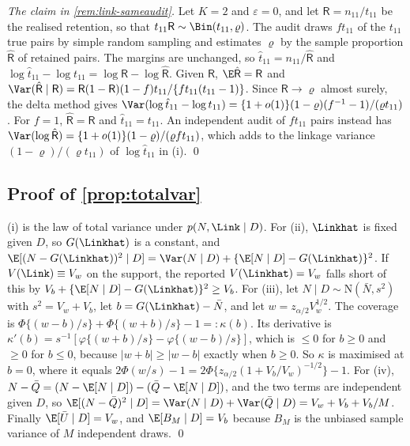 \emph{The claim in \cref{rem:link-sameaudit}.} Let $K=2$ and $\varepsilon=0$, and let $\mathsf R=n_{11}/t_{11}$ be the realised retention, so that $t_{11}\mathsf R\sim\Bin(t_{11},\varrho)$. The audit draws $ft_{11}$ of the $t_{11}$ true pairs by simple random sampling and estimates $\varrho$ by the sample proportion $\hat{\mathsf R}$ of retained pairs. The margins are unchanged, so $\hat t_{11}=n_{11}/\hat{\mathsf R}$ and $\log\hat t_{11}-\log t_{11}=\log\mathsf R-\log\hat{\mathsf R}$. Given $\mathsf R$, $\E\hat{\mathsf R}=\mathsf R$ and $\Var(\hat{\mathsf R}\mid\mathsf R)=\mathsf R(1-\mathsf R)(1-f)t_{11}/\{ft_{11}(t_{11}-1)\}$. Since $\mathsf R\to\varrho$ almost surely, the delta method gives $\Var(\log\hat t_{11}-\log t_{11})=\{1+o(1)\}(1-\varrho)(f^{-1}-1)/(\varrho t_{11})$. For $f=1$, $\hat{\mathsf R}=\mathsf R$ and $\hat t_{11}=t_{11}$. An independent audit of $ft_{11}$ pairs instead has $\Var(\log\hat{\mathsf R})=\{1+o(1)\}(1-\varrho)/(\varrho ft_{11})$, which adds to the linkage variance $(1-\varrho)/(\varrho t_{11})$ of $\log\hat t_{11}$ in (i). \qed

\subsection{Proof of \texorpdfstring{\cref{prop:totalvar}}{the total-variance decomposition}}\label{app:link-totalvar}

(i) is the law of total variance under $p(N,\Link\mid D)$. For (ii), $\Linkhat$ is fixed given $D$, so $G(\Linkhat)$ is a constant, and $\E[(N-G(\Linkhat))^2\mid D]=\Var(N\mid D)+\{\E[N\mid D]-G(\Linkhat)\}^2$. If $V(\Link)\equiv V_w$ on the support, the reported $V(\Linkhat)=V_w$ falls short of this by $V_b+\{\E[N\mid D]-G(\Linkhat)\}^2\ge V_b$. For (iii), let $N\mid D\sim\mathrm N(\bar N,s^2)$ with $s^2=V_w+V_b$, let $b=G(\Linkhat)-\bar N$, and let $w=z_{\alpha/2}V_w^{1/2}$. The coverage is $\Phi\{(w-b)/s\}+\Phi\{(w+b)/s\}-1=:\kappa(b)$. Its derivative is $\kappa'(b)=s^{-1}[\varphi\{(w+b)/s\}-\varphi\{(w-b)/s\}]$, which is $\le0$ for $b\ge0$ and $\ge0$ for $b\le0$, because $|w+b|\ge|w-b|$ exactly when $b\ge0$. So $\kappa$ is maximised at $b=0$, where it equals $2\Phi(w/s)-1=2\Phi\{z_{\alpha/2}(1+V_b/V_w)^{-1/2}\}-1$. For (iv), $N-\bar Q=(N-\E[N\mid D])-(\bar Q-\E[N\mid D])$, and the two terms are independent given $D$, so $\E[(N-\bar Q)^2\mid D]=\Var(N\mid D)+\Var(\bar Q\mid D)=V_w+V_b+V_b/M$. Finally $\E[\bar U\mid D]=V_w$, and $\E[B_M\mid D]=V_b$ because $B_M$ is the unbiased sample variance of $M$ independent draws. \qed

